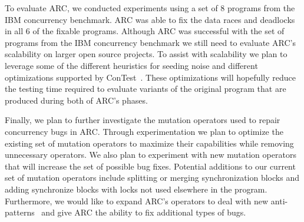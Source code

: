 \documentclass[runningheads,a4paper]{llncs}
\begin{document}
To evaluate ARC, we conducted experiments  using a set of 8 programs from the IBM concurrency benchmark. ARC was able to fix the data races and deadlocks in all 6 of the fixable programs. Although ARC was successful with the set of programs from the IBM concurrency benchmark we still need to evaluate ARC's scalability on larger open source projects. To assist with scalability we plan to leverage some of the different heuristics for seeding noise and different optimizations supported by ConTest~\cite{KLVU10}. These optimizations will hopefully reduce the testing time required to evaluate variants of the original program that are produced during both of ARC's phases.

Finally, we plan to further investigate the mutation operators used to repair concurrency bugs in ARC. Through experimentation we plan to optimize the existing set of mutation operators to maximize their capabilities while removing unnecessary operators.  We also plan to experiment with new mutation operators that will increase the set of possible bug fixes. Potential additions to our current set of mutation operators include splitting or merging synchronization blocks and adding synchronize blocks with locks not used elsewhere in the program. Furthermore, we would like to expand ARC's operators to deal with new anti-patterns~\cite{BJ09, FKLV12} and give ARC the ability to fix additional types of bugs. 





\end{document}
